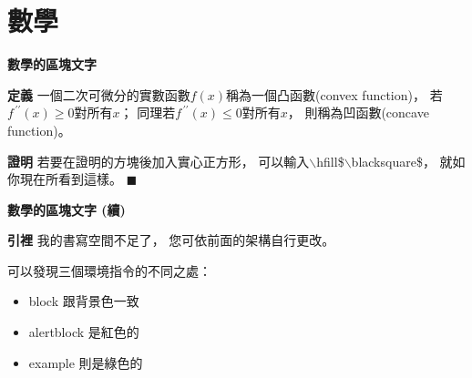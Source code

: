 \documentclass[12pt, aspectratio=43]{beamer}
\begin{document}

\section{數學}


\linespread{1}  %
\begin{frame}{\textbf{數學的區塊文字}}
\linespread{1.5} %

	\begin{block}{\textbf{定義}} 
		一個二次可微分的實數函數$f\left(x\right)$稱為一個凸函數(convex function)，
		若$f^{\,\prime\prime}\!\left(x\right)\ge0$對所有$x$；
		同理若$f^{\,\prime\prime}\!\left(x\right)\le0$對所有$x$，
		則稱為凹函數(concave function)。
	\end{block}
	
	\begin{block}{\textbf{證明}} 
		若要在證明的方塊後加入實心正方形，
		可以輸入$\backslash$hfill\$$\backslash$blacksquare\$，
        就如你現在所看到這樣。
		\hfill$\blacksquare$
	\end{block}
	
\end{frame}


\linespread{1}  %
\begin{frame}{\textbf{數學的區塊文字 (續)}}
\linespread{1.5} %

	\begin{alertblock}{\textbf{引裡}}
		我的書寫空間不足了，
		您可依前面的架構自行更改。
	\end{alertblock}
	
	\begin{example}
		可以發現三個環境指令的不同之處：
		\begin{itemize}
			\item block 跟背景色一致
			\item alertblock 是紅色的
			\item example 則是綠色的
		\end{itemize}
	\end{example}
	
\end{frame}
\end{document}
